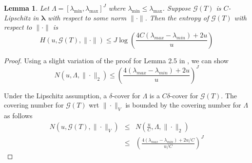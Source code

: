 \documentclass[12pt]{article}
\newtheorem{lemma}{Lemma}
\begin{document}
\begin{lemma}
	\label{lemma:covering_cube}
	Let $\Lambda = [\lambda_{\min}, \lambda_{\max}]^J$ where $\lambda_{\min} \le \lambda_{\max}$. Suppose $\mathcal{G}(T)$ is $C$-Lipschitz in $\boldsymbol{\lambda}$ with respect to some norm $\| \cdot \|$.
	Then the entropy of $\mathcal{G}(T)$ with respect to $\| \cdot \|$ is
	\begin{equation}
	H\left(u, \mathcal{G}(T),\|\cdot\|\right) \le
	J \log \left(\frac{4C\left(\lambda_{max}-\lambda_{min}\right)+2u}{u}\right)
	\end{equation}
\end{lemma}
\begin{proof}
	Using a slight variation of the proof for Lemma 2.5 in \citet{van2000empirical}, we can show
	\begin{equation}
	N\left(u,\Lambda,\|\cdot\|_{2}\right) \le \left(\frac{4\left(\lambda_{max}-\lambda_{min}\right)+2u}{u}\right)^{J}
	\end{equation}
	
	Under the Lipschitz assumption, a $\delta$-cover for $\Lambda$
	is a $C\delta$-cover for $\mathcal{G}(T)$. The covering number for $\mathcal{G}(T)$ wrt $\|\cdot\|_{V}$ is bounded by the covering number for $\Lambda$ as follows
	\begin{eqnarray}
	N\left(u,\mathcal{G}(T),\|\cdot\|_{V}\right)
	&\le& N\left(\frac{u}{C},\Lambda,\|\cdot\|_{2}\right)\\
	&\le& \left(\frac{4\left(\lambda_{max}-\lambda_{min}\right)+2u/C}{u/C}\right)^{J}
	\end{eqnarray}
\end{proof}
\end{document}

